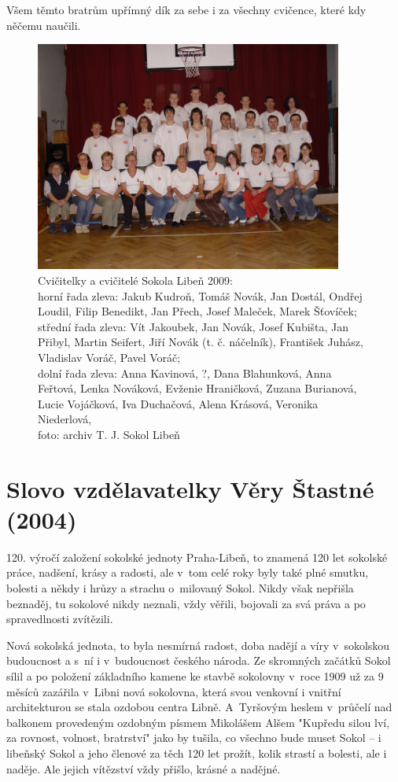 \documentclass[a5paper, 11pt, twoside]{article}
\begin{document}
Všem těmto bratrům upřímný dík za sebe i za všechny cvičence, které kdy
něčemu naučili.

\begin{figure}[h!]
  \centering 
  \includegraphics[width=0.9\textwidth]{img/48_cvicitele.JPG}
  \caption*{Cvičitelky a cvičitelé Sokola Libeň 2009: \\
  horní řada zleva: Jakub Kudroň, Tomáš Novák, Jan Dostál, Ondřej Loudil, Filip Benedikt, Jan
  Přech, Josef Maleček, Marek Šťovíček; \\
  střední řada zleva: Vít Jakoubek,
  Jan Novák, Josef Kubišta, Jan Přibyl, Martin Seifert, Jiří Novák (t. č.
  náčelník), František Juhász, Vladislav Voráč, Pavel Voráč; \\
  dolní řada
  zleva: Anna Kavinová, ?, Dana Blahunková, Anna Feřtová, Lenka Nováková,
  Evženie Hraničková, Zuzana Burianová, Lucie Vojáčková, Iva Duchačová,
  Alena Krásová, Veronika Niederlová, \\
  foto: archiv T. J. Sokol Libeň}
\end{figure}

\section{Slovo vzdělavatelky Věry Štastné
(2004)}

120. výročí založení sokolské jednoty Praha-Libeň, to znamená 120 let
sokolské práce, nadšení, krásy a radosti, ale v~tom celé roky byly také
plné smutku, bolesti a někdy i hrůzy a strachu o~milovaný Sokol. Nikdy
však nepřišla beznaděj, tu sokolové nikdy neznali, vždy věřili, bojovali
za svá práva a po spravedlnosti zvítězili.

Nová sokolská jednota, to byla nesmírná radost, doba nadějí a víry
v~sokolskou budoucnost a s~ní i v~budoucnost českého národa. Ze skromných
začátků Sokol sílil a po položení základního kamene ke stavbě sokolovny
v~roce 1909 už za 9 měsíců zazářila v~Libni nová sokolovna, která svou
venkovní i vnitřní architekturou se stala ozdobou centra Libně.
A~Tyršovým heslem v~průčelí nad balkonem provedeným ozdobným písmem
Mikolášem Alšem "Kupředu silou lví, za rovnost, volnost, bratrství"
jako by tušila, co všechno bude muset Sokol --⁠⁠⁠⁠⁠⁠ i libeňský Sokol a jeho
členové za těch 120 let prožít, kolik strastí a bolesti, ale i naděje.
Ale jejich vítězství vždy přišlo, krásné a nadějné.
\end{document}
